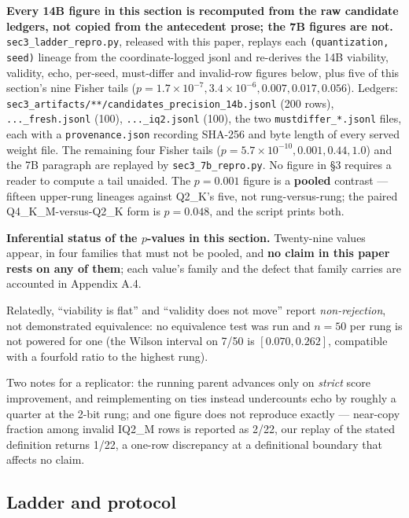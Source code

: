 \textbf{Every 14B figure in this section is recomputed from the raw candidate ledgers, not copied from the antecedent prose; the 7B figures are not.} \texttt{sec3\_ladder\_repro.py}, released with this paper, replays each \texttt{(quantization, seed)} lineage from the coordinate-logged jsonl and re-derives the 14B viability, validity, echo, per-seed, must-differ and invalid-row figures below, plus five of this section's nine Fisher tails ($p = 1.7\times10^{-7}, 3.4\times10^{-6}, 0.007, 0.017, 0.056$). Ledgers: \texttt{sec3\_\bk{}artifacts/\bk{}**/\bk{}candidates\_\bk{}precision\_\bk{}14b.jsonl} (200 rows), \texttt{...\_fresh.jsonl} (100), \texttt{...\_iq2.jsonl} (100), the two \texttt{mustdiffer\_*.jsonl} files, each with a \texttt{provenance.json} recording SHA-256 and byte length of every served weight file. The remaining four Fisher tails ($p = 5.7\times10^{-10}, 0.001, 0.44, 1.0$) and the 7B paragraph are replayed by \texttt{sec3\_7b\_repro.py}. No figure in \S3 requires a reader to compute a tail unaided. The $p = 0.001$ figure is a \textbf{pooled} contrast --- fifteen upper-rung lineages against Q2\_K's five, not rung-versus-rung; the paired Q4\_K\_M-versus-Q2\_K form is $p = 0.048$, and the script prints both.

\textbf{Inferential status of the $p$-values in this section.} Twenty-nine values appear, in four families that must not be pooled, and \textbf{no claim in this paper rests on any of them}; each value's family and the defect that family carries are accounted in Appendix A.4.

Relatedly, ``viability is flat'' and ``validity does not move'' report \emph{non-rejection}, not demonstrated equivalence: no equivalence test was run and $n = 50$ per rung is not powered for one (the Wilson interval on 7/50 is $[0.070, 0.262]$, compatible with a fourfold ratio to the highest rung).

Two notes for a replicator: the running parent advances only on \emph{strict} score improvement, and reimplementing on ties instead undercounts echo by roughly a quarter at the 2-bit rung; and one figure does not reproduce exactly --- near-copy fraction among invalid IQ2\_M rows is reported as 2/22, our replay of the stated definition returns 1/22, a one-row discrepancy at a definitional boundary that affects no claim.

\subsection{Ladder and protocol}

